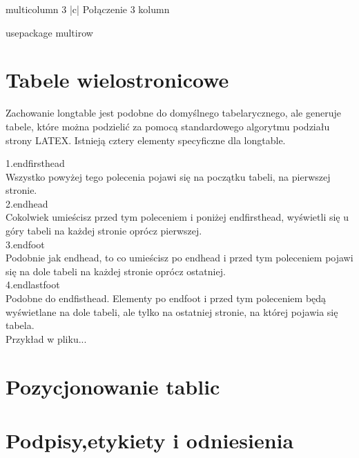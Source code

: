 \documentclass{beamer}
\begin{document}
\begin{frame}

 multicolumn  {3}  {|c|}  {Połączenie 3 kolumn}
 
 usepackage	{multirow}
\end{frame}

\section{Tabele wielostronicowe}
\begin{frame}[fragile]
 
Zachowanie longtable jest podobne do domyślnego tabelarycznego, ale generuje tabele, które można podzielić za pomocą standardowego algorytmu podziału strony LATEX. Istnieją cztery elementy specyficzne dla longtable.
\end{frame}

\begin{frame}

1.endfirsthead\\
Wszystko powyżej tego polecenia pojawi się na początku tabeli, na pierwszej stronie.\\

2.endhead\\
Cokolwiek umieścisz przed tym poleceniem i poniżej endfirsthead, wyświetli się u góry tabeli na każdej stronie oprócz pierwszej.\\

3.endfoot\\
Podobnie jak endhead, to co umieścisz po endhead i przed tym poleceniem pojawi się na dole tabeli na każdej stronie oprócz ostatniej.\\

4.endlastfoot\\
Podobne do endfisthead. Elementy po endfoot i przed tym poleceniem będą wyświetlane na dole tabeli, ale tylko na ostatniej stronie, na której pojawia się tabela.\\
Przykład w pliku...
\end{frame}

\section{Pozycjonowanie tablic}
\begin{frame}
 
\end{frame}

\section{Podpisy,etykiety i odniesienia}
\begin{frame}
 
\end{frame}
\end{document}
